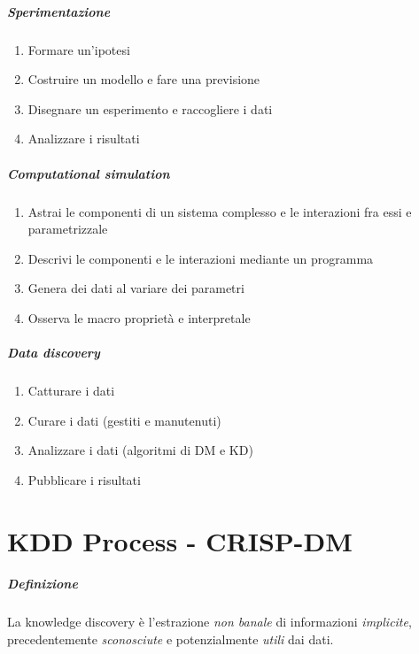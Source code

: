 \documentclass[11pt,onecolumn,a4paper,oneside]{book}
\begin{document}
\paragraph{Sperimentazione}
\begin{enumerate}
\item Formare un'ipotesi
\item Costruire un modello e fare una previsione
\item Disegnare un esperimento e raccogliere i dati
\item Analizzare i risultati
\end{enumerate}

\paragraph{Computational simulation}
\begin{enumerate}
\item Astrai le componenti di un sistema complesso e le interazioni fra essi e parametrizzale
\item Descrivi le componenti e le interazioni mediante un programma
\item Genera dei dati al variare dei parametri
\item Osserva le macro proprietà e interpretale
\end{enumerate}


\paragraph{Data discovery}
\begin{enumerate}
\item Catturare i dati
\item Curare i dati (gestiti e manutenuti)
\item Analizzare i dati (algoritmi di DM e KD)
\item Pubblicare i risultati
\end{enumerate}

	
\chapter{KDD Process - CRISP-DM}
	\paragraph{Definizione}
		La knowledge discovery è l'estrazione \emph{non banale} di informazioni \emph{implicite}, precedentemente \emph{sconosciute} e potenzialmente \emph{utili} dai dati.	
			
\end{document}
